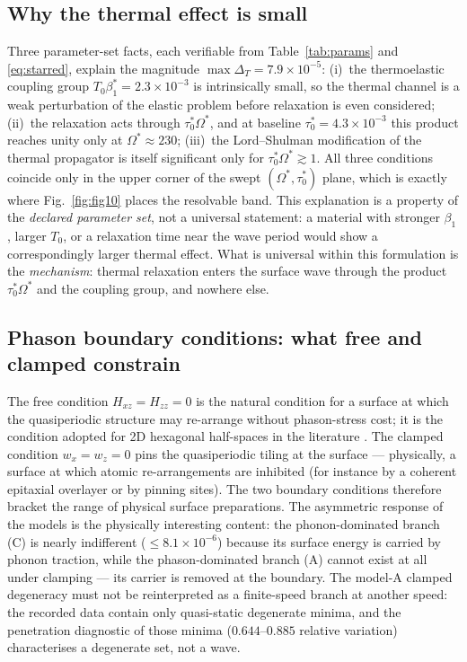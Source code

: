 \documentclass[11pt]{article}
\newcommand{\Om}{\Omega}
\begin{document}
\subsection{Why the thermal effect is small}

Three parameter-set facts, each verifiable from Table~\ref{tab:params} and \eqref{eq:starred}, explain the magnitude $\max\Delta_T=7.9\times10^{-5}$: (i)~the thermoelastic coupling group $T_0\beta_1^*=2.3\times10^{-3}$ is intrinsically small, so the thermal channel is a weak perturbation of the elastic problem before relaxation is even considered; (ii)~the relaxation acts through $\tau_0^*\Om^*$, and at baseline $\tau_0^*=4.3\times10^{-3}$ this product reaches unity only at $\Om^*\approx230$; (iii)~the Lord--Shulman modification of the thermal propagator is itself significant only for $\tau_0^*\Om^*\gtrsim1$. All three conditions coincide only in the upper corner of the swept $(\Om^*,\tau_0^*)$ plane, which is exactly where Fig.~\ref{fig:fig10} places the resolvable band. This explanation is a property of the \emph{declared parameter set}, not a universal statement: a material with stronger $\beta_1$, larger $T_0$, or a relaxation time near the wave period would show a correspondingly larger thermal effect. What is universal within this formulation is the \emph{mechanism}: thermal relaxation enters the surface wave through the product $\tau_0^*\Om^*$ and the coupling group, and nowhere else.

\subsection{Phason boundary conditions: what free and clamped constrain}

The free condition $H_{xz}=H_{zz}=0$ is the natural condition for a surface at which the quasiperiodic structure may re-arrange without phason-stress cost; it is the condition adopted for 2D hexagonal half-spaces in the literature \cite{wang2015}. The clamped condition $w_x=w_z=0$ pins the quasiperiodic tiling at the surface --- physically, a surface at which atomic re-arrangements are inhibited (for instance by a coherent epitaxial overlayer or by pinning sites). The two boundary conditions therefore bracket the range of physical surface preparations. The asymmetric response of the models is the physically interesting content: the phonon-dominated branch (C) is nearly indifferent ($\le8.1\times10^{-6}$) because its surface energy is carried by phonon traction, while the phason-dominated branch (A) cannot exist at all under clamping --- its carrier is removed at the boundary. The model-A clamped degeneracy must not be reinterpreted as a finite-speed branch at another speed: the recorded data contain only quasi-static degenerate minima, and the penetration diagnostic of those minima ($0.644$--$0.885$ relative variation) characterises a degenerate set, not a wave.
\end{document}
